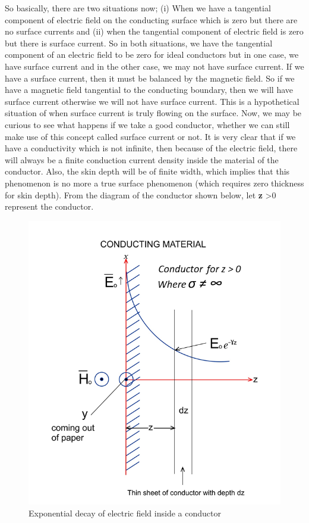 So basically, there are two situations now; (i) When we have a tangential component of electric field on the conducting surface which is zero but there are no surface currents and (ii) when the tangential component of electric field is zero but there is surface current. So in both situations, we have the tangential component of an electric field to be zero for ideal conductors but in one case, we have surface current and in the other case, we may not have surface current. If we have a surface current, then it must be balanced by the magnetic field. So if we have a magnetic field tangential to the conducting boundary, then we will have surface current otherwise we will not have surface current. This is a hypothetical situation of when surface current is truly flowing on the surface. Now, we may be curious to see what happens if we take a good conductor, whether we can still make use of this concept called surface current or not. It is very clear that if we have a conductivity which is not infinite, then because of the electric field, there will always be a finite conduction current density inside the material of the conductor. Also, the skin depth will be of finite width, which implies that this phenomenon is no more a true surface phenomenon (which requires zero thickness for skin depth). From the diagram of the conductor shown below, let \textbf{z} \textgreater 0 represent the conductor.
\begin{figure}[h]
\centering
\includegraphics[width=0.9\linewidth]{./graphics/thin_sheet_conductor}
\caption{Exponential decay of electric field inside a conductor}
\label{fig:exponential_decay_of_E_in_conductor}
\end{figure}	

